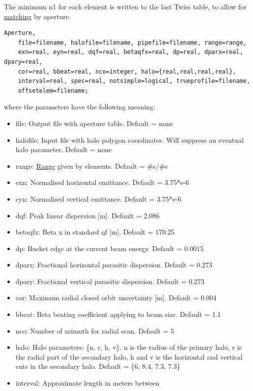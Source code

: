 The minimum n1 for each element is written to the last Twiss table, to
allow for \href{../match/match.html}{matching} by aperture.   
	
\begin{verbatim}
Aperture,
    file=filename, halofile=filename, pipefile=filename, range=range,
    exn=real, eyn=real, dqf=real, betaqfx=real, dp=real, dparx=real, dpary=real,
    cor=real, bbeat=real, nco=integer, halo={real,real,real,real},
    interval=real, spec=real, notsimple=logical, trueprofile=filename,
    offsetelem=filename;
\end{verbatim} 
where the parameters have the following meaning: 
\begin{itemize}
   \item file: Output file with aperture table. Default = none 
   \item halofile: Input file with halo polygon coordinates. Will
     suppress  an eventual halo parameter. Default = none  
   \item range: \href{../Introduction/ranges.html}{Range} given by
     elements. Default = \#s/\#e  
   \item exn: Normalised horizontal emittance. Default = 3.75*e-6  
   \item eyn: Normalised vertical emittance. Default = 3.75*e-6 
   \item dqf: Peak linear dispersion [m]. Default = 2.086 
   \item betaqfx: Beta x in standard qf [m]. Default = 170.25 
   \item dp: Bucket edge at the current beam energy. Default = 0.0015 
   \item dparx: Fractional horizontal parasitic dispersion. Default = 0.273 
   \item dpary: Fractional vertical parasitic dispersion. Default = 0.273 
   \item cor: Maximum radial closed orbit uncertainty [m]. Default = 0.004 
   \item bbeat: Beta beating coefficient applying to beam size. Default = 1.1 
   \item nco: Number of azimuth for radial scan. Default = 5 
   \item halo: Halo parameters: \{n, r, h, v\}. n is the radius of the
     primary halo,  r is the radial part of the secondary halo, h and v
     is the horizontal and  vertical cuts in the secondary halo. Default
     = \{6, 8.4, 7.3, 7.3\}  
   \item interval: Approximate length in meters between

\end{itemize}
